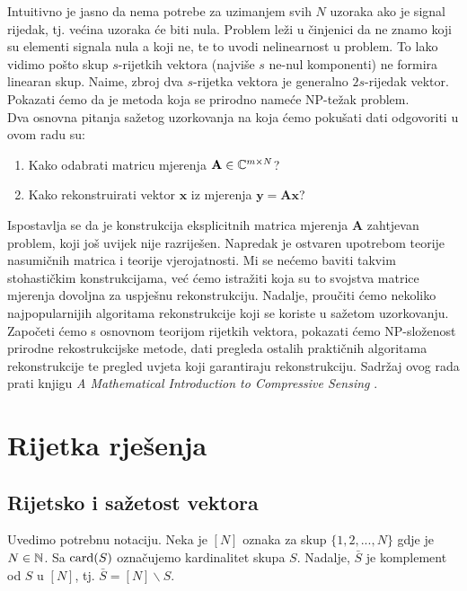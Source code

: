 \documentclass[a4paper,twoside,12pt]{memoir} %
\newcommand{\vect}[1]{\mathbf{#1}}
\renewcommand{\vec}{\vect}
\newcommand{\card}{\text{\normalfont{card}}}
\begin{document}
\begin{intro}
    \indent
    Intuitivno je jasno da nema potrebe za uzimanjem svih $N$ uzoraka ako je signal rijedak, tj. ve\'cina uzoraka \'ce biti nula. Problem le\v{z}i u \v{c}injenici da ne znamo koji su elementi signala nula a koji ne, te to uvodi nelinearnost u problem. To lako vidimo po\v{s}to skup $s$-rijetkih vektora (najvi\v{s}e $s$ ne-nul komponenti) ne formira linearan skup. Naime, zbroj dva $s$-rijetka vektora je generalno $2s$-rijedak vektor. Pokazati \'cemo da je metoda koja se prirodno name\'ce NP-te\v{z}ak problem. \\
    \indent
    Dva osnovna pitanja sa\v{z}etog uzorkovanja na koja \'cemo poku\v{s}ati dati odgovoriti u ovom radu su:
    \begin{enumerate}
        \item Kako odabrati matricu mjerenja $\vec A \in \C^{m \times N}$? 
        \item Kako rekonstruirati vektor $\vec x$ iz mjerenja $ \vec y = \vec{Ax}$?
    \end{enumerate}
    Ispostavlja se da je konstrukcija eksplicitnih matrica mjerenja $\vec A$ zahtjevan problem, koji jo\v{s} uvijek nije razrije\v{s}en. Napredak je ostvaren upotrebom teorije nasumi\v{c}nih matrica i teorije vjerojatnosti. Mi se ne\'cemo baviti takvim stohasti\v{c}kim konstrukcijama, ve\'c \'cemo istra\v{z}iti koja su to svojstva matrice mjerenja dovoljna za uspje\v{s}nu rekonstrukciju. Nadalje, prou\v{c}iti \'cemo nekoliko najpopularnijih algoritama rekonstrukcije koji se koriste u sa\v{z}etom uzorkovanju. Zapo\v{c}eti \'cemo s osnovnom teorijom rijetkih vektora, pokazati \'cemo NP-slo\v{z}enost prirodne rekostrukcijske metode, dati pregleda ostalih prakti\v{c}nih algoritama rekonstrukcije te pregled uvjeta koji garantiraju rekonstrukciju. Sadr\v{z}aj ovog rada prati knjigu \textit{A Mathematical Introduction to Compressive Sensing} \cite{foucart13}.

\end{intro}

\chapter[Rijetka rje\v{s}enja][Rijetka rje\v{s}enja]{Rijetka rje\v{s}enja}\label{chapter_rijetka_rijesenja}	

\section[Rijetsko i sa\v{z}etost vektora][Rijetsko i sa\v{z}etost vektora]{Rijetsko i sa\v{z}etost vektora}
Uvedimo potrebnu notaciju. Neka je $[N]$ oznaka za skup $\{1,2,...,N\}$ gdje je $N\in\mathbb{N}$. Sa $\card(S)$ ozna\v{c}ujemo kardinalitet skupa $S$. Nadalje, $\bar{S}$ je komplement od $S$ u $[N]$, tj. $\bar{S}=[N]\backslash S$.
\end{document}
